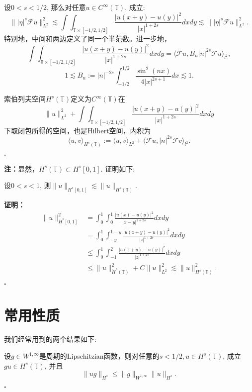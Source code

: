\begin{thm} \songti\rm 设$0<s<1/2$, 那么对任意$u\in C^{\infty}(\mathbb{T})$, 成立:$$\||\eta|^s\mathcal{F}u\|_{L^2}^2\lesssim\int\int_{\mathbb{T}\times [-1/2,1/2]}\frac{|u(x+y)-u(y)|^2}{|x|^{1+2s}}dxdy\lesssim\||\eta|^s\mathcal{F}u\|_{L^2}^2.$$
特别地，中间和两边定义了同一个半范数。进一步地，$$\int\int_{\mathbb{T}\times [-1/2,1/2]}\frac{|u(x+y)-u(y)|^2}{|x|^{1+2s}}dxdy=\langle \mathcal{F}u, B_n|n|^{2s}\mathcal{F}u\rangle_{l^2},$$ $$1\lesssim B_n:=|n|^{-2s}\int_{-1/2}^{1/2}\frac{\sin^2(nx)}{4|x|^{2s+1}}dx\lesssim 1.$$

索伯列夫空间$H^s(\mathbb{T})$定义为$C^{\infty}(\mathbb{T})$在$$\|u\|_{L^2}^2+\int\int_{\mathbb{T}\times [-1/2,1/2]}\frac{|u(x+y)-u(y)|^2}{|x|^{1+2s}}dxdy$$下取闭包所得的空间，也是Hilbert空间，内积为$$\langle u, v\rangle_{H^s(\mathbb{T})}:=\langle u,v\rangle _{L^2}+\langle\mathcal{F}u,|n|^{2s}\mathcal{F}v\rangle_{l^2}.$$
\end{thm}
\begin{flushright}
$\square$
\end{flushright}

\textbf{注：}显然，$H^s(\mathbb{T})\subset H^s[0,1]$. 证明如下:

\begin{thm}
\songti\rm 设$0<s<1$, 则$\|u\|_{H^s[0,1]}\lesssim\|u\|_{H^s(\mathbb{T})}$.
\end{thm}

\textbf{证明：}
\[
\begin{aligned}
\|u\|_{\dot{H}^s[0,1]}^2&=\int_0^1\int_0^1\frac{|u(x)-u(y)|^2}{|x-y|^{1+2s}}dxdy \\
&=\int_0^1\int_{-y}^{1-y}\frac{|u(z+y)-u(y)|^2}{|z|^{1+2s}}dxdy \\
&\leq\int_0^1\int_{-1}^{2}\frac{|u(z+y)-u(y)|^2}{|z|^{1+2s}}dxdy \\
&\leq\|u\|_{\dot{H}^s(\mathbb{T})}^2+C\|u\|_{L^2}^2\lesssim\|u\|_{H^s(\mathbb{T})}^2.
\end{aligned}
\]
\begin{flushright}
$\square$
\end{flushright}

\section{常用性质}

我们经常用到的两个结果如下:
\begin{lem}
\songti\rm 设$g\in W^{1,\infty}$是周期的Lipschitzian函数，则对任意的$s<1/2,u\in H^s(\mathbb{T})$, 成立$gu\in H^s(\mathbb{T})$, 并且
\[
\|ug\|_{H^s}\leq \|g\|_{W^{1,\infty}}\|u\|_{H^s}.
\]
\end{lem}
\begin{flushright}
$\square$
\end{flushright}

